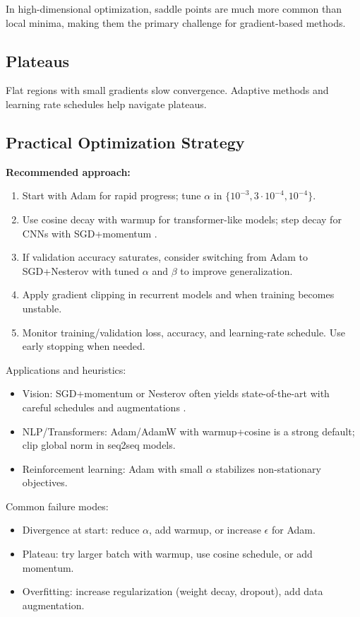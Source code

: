 In high-dimensional optimization, saddle points are much more common than local minima, making them the primary challenge for gradient-based methods.

\subsection{Plateaus}

Flat regions with small gradients slow convergence. Adaptive methods and learning rate schedules help navigate plateaus.

\subsection{Practical Optimization Strategy}

\textbf{Recommended approach:}
\begin{enumerate}
    \item Start with Adam \cite{Kingma2014} for rapid progress; tune $\alpha$ in $\{10^{-3},3\cdot10^{-4},10^{-4}\}$.
    \item Use cosine decay with warmup for transformer-like models; step decay for CNNs with SGD+momentum \cite{WebOptimizationDLBook,D2LChapterOptimization,He2016}.
    \item If validation accuracy saturates, consider switching from Adam to SGD+Nesterov with tuned $\alpha$ and $\beta$ to improve generalization.
    \item Apply gradient clipping in recurrent models and when training becomes unstable.
    \item Monitor training/validation loss, accuracy, and learning-rate schedule. Use early stopping when needed.
\end{enumerate}

Applications and heuristics:
\begin{itemize}
    \item Vision: SGD+momentum or Nesterov often yields state-of-the-art with careful schedules and augmentations \cite{He2016}.
    \item NLP/Transformers: Adam/AdamW with warmup+cosine is a strong default; clip global norm in seq2seq models.
    \item Reinforcement learning: Adam with small $\alpha$ stabilizes non-stationary objectives.
\end{itemize}

Common failure modes:
\begin{itemize}
    \item Divergence at start: reduce $\alpha$, add warmup, or increase \(\epsilon\) for Adam.
    \item Plateau: try larger batch with warmup, use cosine schedule, or add momentum.
    \item Overfitting: increase regularization (weight decay, dropout), add data augmentation.
\end{itemize}
